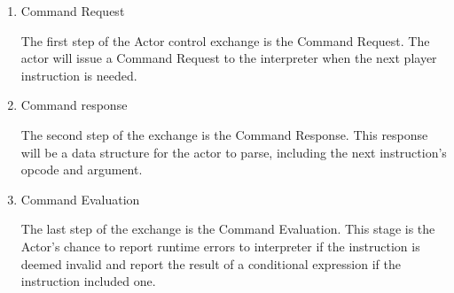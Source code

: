 \begin{enumerate}
    \item Command Request
    
    The first step of the Actor control exchange is the Command Request. The actor will issue a Command Request to the interpreter when the next player instruction is needed.

    \item Command response
    
    The second step of the exchange is the Command Response. This response will be a data structure for the actor to parse, including the next instruction's opcode and argument.

    \item Command Evaluation
    
    The last step of the exchange is the Command Evaluation. This stage is the Actor's chance to report runtime errors to interpreter if the instruction is deemed invalid and report the result of a conditional expression if the instruction included one. 
\end{enumerate}